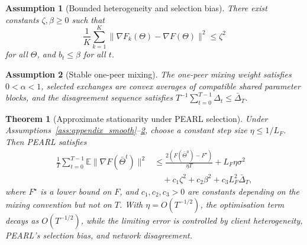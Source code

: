 \documentclass[conference]{IEEEtran}
\newtheorem{assumption}{Assumption}
\newtheorem{theorem}{Theorem}
\begin{document}
\begin{assumption}[Bounded heterogeneity and selection bias]
\label{ass:appendix_bias}
There exist constants \(\zeta,\beta\geq0\) such that
\begin{equation*}
    \frac{1}{K}\sum_{k=1}^{K}
    \|\nabla F_k(\Theta)-\nabla F(\Theta)\|^2
    \leq
    \zeta^2
\end{equation*}
for all \(\Theta\), and \(b_t\leq\beta\) for all \(t\).
\end{assumption}

\begin{assumption}[Stable one-peer mixing]
\label{ass:appendix_mixing}
The one-peer mixing weight satisfies \(0<\alpha<1\), selected exchanges are convex averages of compatible shared parameter blocks, and the disagreement sequence satisfies \(T^{-1}\sum_{t=0}^{T-1}\Delta_t\leq\bar{\Delta}_T\).
\end{assumption}

\begin{theorem}[Approximate stationarity under PEARL selection]
\label{thm:pearl_stationarity}
Under Assumptions~\ref{ass:appendix_smooth}--\ref{ass:appendix_mixing}, choose a constant step size \(\eta\leq 1/L_F\). Then PEARL satisfies
\begin{equation*}
\begin{aligned}
\frac{1}{T}\sum_{t=0}^{T-1}
\mathbb{E}\|\nabla F(\bar{\Theta}^t)\|^2
&\leq
\frac{2\left(F(\bar{\Theta}^0)-F^\star\right)}{\eta T}
 + L_F\eta\sigma^2 \\
&\quad
 + c_1\zeta^2
 + c_2\beta^2
 + c_3 L_F^2\bar{\Delta}_T ,
\end{aligned}
\end{equation*}
where \(F^\star\) is a lower bound on \(F\), and \(c_1,c_2,c_3>0\) are constants depending on the mixing convention but not on \(T\). With \(\eta=O(T^{-1/2})\), the optimisation term decays as \(O(T^{-1/2})\), while the limiting error is controlled by client heterogeneity, PEARL's selection bias, and network disagreement.
\end{theorem}
\end{document}
